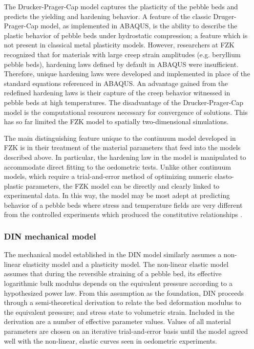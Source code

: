 The Drucker-Prager-Cap model captures the plasticity of the pebble beds and predicts the yielding and hardening behavior. A feature of the classic Druger-Prager-Cap model, as implemented in ABAQUS, is the ability to describe the plastic behavior of pebble beds under hydrostatic compression; a feature which is not present in classical metal plasticity models. However, researchers at FZK recognized that for materials with large creep strain amplitudes (e.g. beryllium pebble beds), hardening laws defined by default in ABAQUS were insufficient. Therefore, unique hardening laws were developed and implemented in place of the standard equations referenced in ABAQUS. An advantage gained from the redefined hardening laws is their capture of the creep behavior witnessed in pebble beds at high temperatures. The disadvantage of the Drucker-Prager-Cap model is the computational resources necessary for convergence of solutions. This has so far limited the FZK model to spatially two-dimensional simulations.

The main distinguishing feature unique to the continuum model developed in FZK is in their treatment of the material parameters that feed into the models described above. In particular, the hardening law in the model is manipulated to accommodate direct fitting to the oedometric tests. Unlike other continuum models, which require a trial-and-error method of optimizing numeric elasto-plastic parameters, the FZK model can be directly and clearly linked to experimental data. In this way, the model may be most adept at predicting behavior of a pebble beds where stress and temperature fields are very different from the controlled experiments which produced the constitutive relationships \cite{Gan2007189,Gan:2009vn,Gan:2010lh,Gan:2010kc}.

\subsubsection{DIN mechanical model}
The mechanical model established in the DIN model similarly assumes a non-linear elasticity model and a plasticity model. The non-linear elastic model assumes that during the reversible straining of a pebble bed, its effective logarithmic bulk modulus depends on the equivalent pressure according to a hypothesized power law. From this assumption as the foundation, DIN proceeds through a semi-theoretical derivation to relate the bed deformation modulus to the equivalent pressure; and stress state to volumetric strain. Included in the derivation are a number of effective parameter values. Values of all material parameters are chosen on an iterative trial-and-error basis until the model agreed well with the non-linear, elastic curves seen in oedometric experiments.

